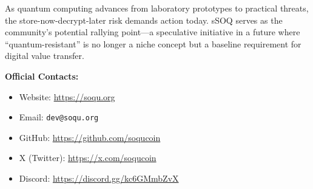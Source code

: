 \documentclass[10pt]{article}
\begin{document}
As quantum computing advances from laboratory prototypes to practical threats, the store-now-decrypt-later risk demands action today. sSOQ serves as the community's potential rallying point—a speculative initiative in a future where ``quantum-resistant'' is no longer a niche concept but a baseline requirement for digital value transfer.

\vspace{1em}

\noindent\textbf{Official Contacts:}
\begin{itemize}
    \item Website: \url{https://soqu.org}
    \item Email: \texttt{dev@soqu.org}
    \item GitHub: \url{https://github.com/soqucoin}
    \item X (Twitter): \url{https://x.com/soqucoin}
    \item Discord: \url{https://discord.gg/kc6GMmbZvX}
\end{itemize}
\end{document}
